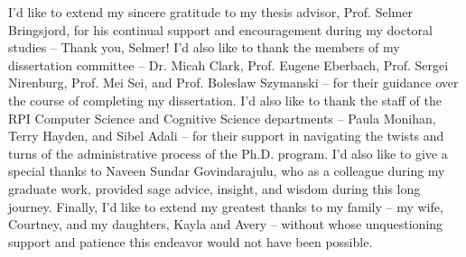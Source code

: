  

I'd like to extend my sincere gratitude to my thesis advisor, Prof. Selmer Bringsjord, for his continual support and encouragement during my doctoral studies -- Thank you, Selmer!  I'd also like to thank the members of my dissertation committee -- Dr. Micah Clark, Prof. Eugene Eberbach, Prof. Sergei Nirenburg, Prof. Mei Sei, and Prof. Boleslaw Szymanski -- for their guidance over the course of completing my dissertation.  I'd also like to thank the staff of the RPI Computer Science and Cognitive Science departments -- Paula Monihan, Terry Hayden, and Sibel Adali -- for their support in navigating the twists and turns of the administrative process of the Ph.D. program.  I'd also like to give a special thanks to Naveen Sundar Govindarajulu, who as a colleague during my graduate work, provided sage advice, insight, and wisdom during this long journey.  Finally, I'd like to extend my greatest thanks to my family -- my wife, Courtney, and my daughters, Kayla and Avery -- without whose unquestioning support and patience this endeavor would not have been possible.